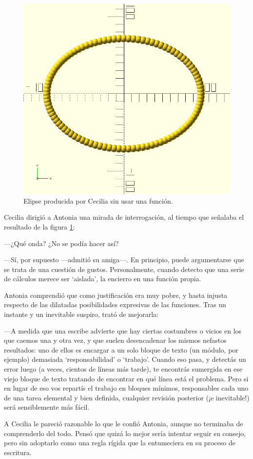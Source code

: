 \begin{figure}[ht]
  \centering
  \includegraphics[width=.5\textwidth]{imagenes/elipse-funcion}
  \caption{Elipse producida por Cecilia sin usar una función.}
  \label{fig:elipse-funcion-2}
\end{figure}

Cecilia dirigió a Antonia una mirada de interrogación, al tiempo que
señalaba el resultado de la figura \ref{fig:elipse-funcion-2}:

---¿Qué onda? ¿No se podía hacer así?

---Sí, por supuesto ---admitió su amiga---. En principio, puede
argumentarse que se trata de una cuestión de gustos. Personalmente,
cuando detecto que una serie de cálculos merece ser `aislada', la
encierro en una función propia.

Antonia comprendió que como justificación era muy pobre, y hasta
injusta respecto de las dilatadas posibilidades expresivas de las
funciones. Tras un instante y un inevitable suspiro, trató de
mejorarla:

---A medida que una escribe advierte que hay ciertas costumbres o
vicios en los que caemos una y otra vez, y que suelen desencadenar los
mismos nefastos resultados: uno de ellos es encargar a un solo bloque
de texto (un módulo, por ejemplo) demasiada `responsabilidad' o
`trabajo'. Cuando eso pasa, y detectás un error luego (a veces,
cientos de líneas más tarde), te encontrás sumergida en ese viejo
bloque de texto tratando de encontrar en qué línea está el
problema. Pero si en lugar de eso vos repartís el trabajo en bloques
mínimos, responsables cada uno de una tarea elemental y bien definida,
cualquier revisión posterior (¡e inevitable!) será sensiblemente más
fácil.

A Cecilia le pareció razonable lo que le confió Antonia, aunque no
terminaba de comprenderlo del todo. Pensó que quizá lo mejor sería
intentar seguir su consejo, pero sin adoptarlo como una regla rígida
que la entumeciera en su proceso de escritura.

